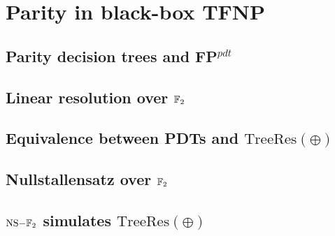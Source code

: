 
\chapter{Parity in black-box \textsf{TFNP}} \label{chap:parity-tfnp}

\section{Parity decision trees and \textsf{FP}$^{pdt}$}

\section{Linear resolution over $\mathbb{F}_2$}

\section{Equivalence between PDTs and $\mathrm{TreeRes}(\oplus)$}

\section{Nullstallensatz over $\mathbb{F}_2$}

\section{$\mathrm{NS-}\mathbb{F}_2$ simulates $\mathrm{TreeRes}(\oplus)$}

\cleardoublepage
